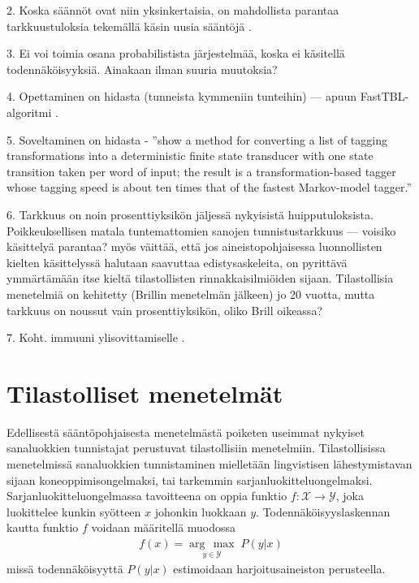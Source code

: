 \documentclass[utf8,bachelor,manualbib]{gradu3}
\newcommand{\argmax}[1]{\underset{#1}{\operatorname{arg}\,\operatorname{max}}\;}
\begin{document}
2. Koska säännöt ovat niin yksinkertaisia, on mahdollista parantaa tarkkuustuloksia tekemällä käsin uusia sääntöjä \citep{volk1998}.

3. Ei voi toimia osana probabilistista järjestelmää, koska ei käsitellä todennäköisyyksiä. Ainakaan ilman suuria muutoksia?

4. Opettaminen on hidasta (tunneista kymmeniin tunteihin) --- apuun FastTBL-algoritmi \citep{ngai2001}.

5. Soveltaminen on hidasta - ''show a method for converting a list of tagging transformations into a deterministic finite state transducer with one state transition taken per word of input; the result is a transformation-based tagger whose tagging speed is about ten times that of the fastest Markov-model tagger.'' \citep{roche1995}

6. Tarkkuus on noin prosenttiyksikön jäljessä nykyisistä huipputuloksista. Poikkeuksellisen matala tuntemattomien sanojen tunnistustarkkuus --- voisiko käsittelyä parantaa? \citet{brill1995} myös väittää, että jos aineistopohjaisessa luonnollisten kielten käsittelyssä halutaan saavuttaa edistysaskeleita, on pyrittävä ymmärtämään itse kieltä tilastollisten rinnakkaisilmiöiden sijaan. Tilastollisia menetelmiä on kehitetty (Brillin menetelmän jälkeen) jo 20 vuotta, mutta tarkkuus on noussut vain prosenttiyksikön, oliko Brill oikeassa? \citep{manning2011} 

7. Koht. immuuni ylisovittamiselle \citep{ramshaw1994}.

\chapter{Tilastolliset menetelmät}

Edellisestä sääntöpohjaisesta menetelmästä poiketen useimmat nykyiset sanaluokkien tunnistajat perustuvat tilastollisiin menetelmiin. Tilastollisissa menetelmissä sanaluokkien tunnistaminen mielletään lingvistisen lähestymistavan sijaan koneoppimisongelmaksi, tai tarkemmin sarjanluokitteluongelmaksi. Sarjanluokitteluongelmassa tavoitteena on oppia funktio $f: \mathcal{X} \to \mathcal{Y}$, joka luokittelee kunkin syötteen $x$ johonkin luokkaan $y$. Todennäköisyyslaskennan kautta funktio $f$ voidaan määritellä muodossa
\begin{align}
f(x) = \argmax{y \in \mathcal{Y}} P(y|x)
\end{align}
missä todennäköisyyttä $P(y|x)$ estimoidaan harjoitusaineiston perusteella.
\end{document}
